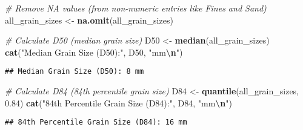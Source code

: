 \documentclass[
]{article}
\newenvironment{Shaded}{\begin{snugshade}}{\end{snugshade}}
\newcommand{\CommentTok}[1]{\textcolor[rgb]{0.56,0.35,0.01}{\textit{#1}}}
\newcommand{\FloatTok}[1]{\textcolor[rgb]{0.00,0.00,0.81}{#1}}
\newcommand{\FunctionTok}[1]{\textcolor[rgb]{0.13,0.29,0.53}{\textbf{#1}}}
\newcommand{\NormalTok}[1]{#1}
\newcommand{\OtherTok}[1]{\textcolor[rgb]{0.56,0.35,0.01}{#1}}
\newcommand{\SpecialCharTok}[1]{\textcolor[rgb]{0.81,0.36,0.00}{\textbf{#1}}}
\newcommand{\StringTok}[1]{\textcolor[rgb]{0.31,0.60,0.02}{#1}}
\begin{document}
\begin{Shaded}
\begin{Highlighting}[]
\CommentTok{\# Remove NA values (from non{-}numeric entries like \textquotesingle{}Fines\textquotesingle{} and \textquotesingle{}Sand\textquotesingle{})}
\NormalTok{all\_grain\_sizes }\OtherTok{\textless{}{-}} \FunctionTok{na.omit}\NormalTok{(all\_grain\_sizes)}

\CommentTok{\# Calculate D50 (median grain size)}
\NormalTok{D50 }\OtherTok{\textless{}{-}} \FunctionTok{median}\NormalTok{(all\_grain\_sizes)}
\FunctionTok{cat}\NormalTok{(}\StringTok{"Median Grain Size (D50):"}\NormalTok{, D50, }\StringTok{"mm}\SpecialCharTok{\textbackslash{}n}\StringTok{"}\NormalTok{)}
\end{Highlighting}
\end{Shaded}

\begin{verbatim}
## Median Grain Size (D50): 8 mm
\end{verbatim}

\begin{Shaded}
\begin{Highlighting}[]
\CommentTok{\# Calculate D84 (84th percentile grain size)}
\NormalTok{D84 }\OtherTok{\textless{}{-}} \FunctionTok{quantile}\NormalTok{(all\_grain\_sizes, }\FloatTok{0.84}\NormalTok{)}
\FunctionTok{cat}\NormalTok{(}\StringTok{"84th Percentile Grain Size (D84):"}\NormalTok{, D84, }\StringTok{"mm}\SpecialCharTok{\textbackslash{}n}\StringTok{"}\NormalTok{)}
\end{Highlighting}
\end{Shaded}

\begin{verbatim}
## 84th Percentile Grain Size (D84): 16 mm
\end{verbatim}
\end{document}
